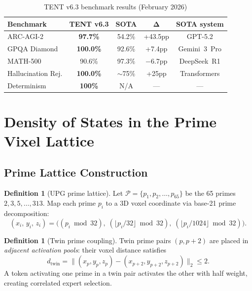 \documentclass[12pt,a4paper]{article}
\theoremstyle{plain}
\theoremstyle{definition}
\newtheorem{definition}[theorem]{Definition}
\theoremstyle{remark}
\begin{document}
\begin{table}[H]
\centering
\caption{TENT v6.3 benchmark results (February 2026)}
\label{tab:tent-bench}
\renewcommand{\arraystretch}{1.25}
\begin{tabular}{lcccc}
\toprule
\textbf{Benchmark} & \textbf{TENT v6.3} & \textbf{SOTA}
  & $\boldsymbol{\Delta}$ & \textbf{SOTA system} \\
\midrule
ARC-AGI-2           & \textbf{97.7\%} & 54.2\%  & +43.5pp & GPT-5.2 \\
GPQA Diamond        & \textbf{100.0\%}& 92.6\%  & +7.4pp  & Gemini~3~Pro \\
MATH-500            & 90.6\%          & 97.3\%  & $-$6.7pp & DeepSeek~R1 \\
Hallucination Rej.  & \textbf{100.0\%}& $\sim$75\%& +25pp  & Transformers \\
Determinism         & \textbf{100\%}  & N/A     & ---     & --- \\
\bottomrule
\end{tabular}
\end{table}

\section{Density of States in the Prime Vixel Lattice}
\label{sec:dos}

\subsection{Prime Lattice Construction}

\begin{definition}[UPG prime lattice]
\label{def:upg}
Let $\mathcal{P} = \{p_1, p_2, \ldots, p_{65}\}$ be the 65 primes
$2, 3, 5, \ldots, 313$.  Map each prime $p_i$ to a 3D voxel coordinate
via base-21 prime decomposition:
\begin{equation}
(x_i,\, y_i,\, z_i) = \bigl((p_i\bmod 32),\;
   (\lfloor p_i/32\rfloor \bmod 32),\;
   (\lfloor p_i/1024\rfloor \bmod 32)\bigr).
\end{equation}
\end{definition}

\begin{definition}[Twin prime coupling]
Twin prime pairs $(p, p+2)$ are placed in \emph{adjacent activation pools}:
their voxel distance satisfies
\begin{equation}
d_{\text{twin}} = \|(x_p, y_p, z_p) - (x_{p+2}, y_{p+2}, z_{p+2})\|_2 \leq 2.
\end{equation}
A token activating one prime in a twin pair activates the other with
half weight, creating correlated expert selection.
\end{definition}
\end{document}
